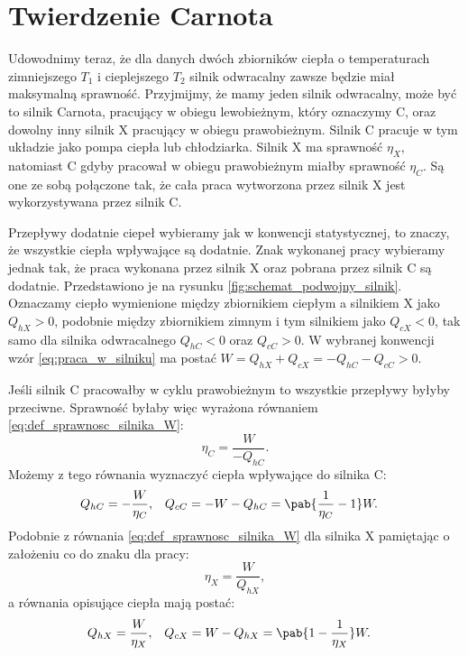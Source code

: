 
\section{Twierdzenie Carnota}
Udowodnimy teraz, że dla danych dwóch zbiorników ciepła o temperaturach zimniejszego \(T_1\) i cieplejszego \(T_2\) silnik odwracalny zawsze będzie miał maksymalną sprawność. Przyjmijmy, że mamy jeden silnik odwracalny, może być to silnik Carnota, pracujący w obiegu lewobieżnym, który oznaczymy C, oraz dowolny inny silnik X pracujący w obiegu prawobieżnym. Silnik C pracuje w tym układzie jako pompa ciepła lub chłodziarka. Silnik X ma sprawność \(\eta_X\), natomiast C gdyby pracował w obiegu prawobieżnym miałby sprawność \(\eta_C\). Są one ze sobą połączone tak, że cała praca wytworzona przez silnik X jest wykorzystywana przez silnik C.

Przepływy dodatnie ciepeł wybieramy jak w konwencji statystycznej, to znaczy, że wszystkie ciepła wpływające są dodatnie. Znak wykonanej pracy wybieramy jednak tak, że praca wykonana przez silnik X oraz pobrana przez silnik C są dodatnie. Przedstawiono je na rysunku \ref{fig:schemat_podwojny_silnik}. Oznaczamy ciepło wymienione między zbiornikiem ciepłym a silnikiem X jako \(Q_{hX} > 0\), podobnie między zbiornikiem zimnym i tym silnikiem jako \(Q_{cX} < 0\), tak samo dla silnika odwracalnego \(Q_{hC} < 0\) oraz \(Q_{cC} > 0\). W wybranej konwencji wzór \eqref{eq:praca_w_silniku} ma postać \(W = Q_{hX} + Q_{cX} = - Q_{hC} - Q_{cC} > 0\).

Jeśli silnik C pracowałby w cyklu prawobieżnym to wszystkie przepływy byłyby przeciwne. Sprawność byłaby więc wyrażona równaniem \eqref{eq:def_sprawnosc_silnika_W}:
\begin{equation}
	\eta_C = \frac{W}{-Q_{hC}}.
\end{equation}
Możemy z tego równania wyznaczyć ciepła wpływające do silnika C:
\begin{align}
	Q_{hC} &= - \frac{W}{\eta_C}, &
	Q_{cC} &= - W - Q_{hC} = \pab{\inv{\eta_C} - 1}W.
\end{align}
Podobnie z równania \eqref{eq:def_sprawnosc_silnika_W} dla silnika X pamiętając o założeniu co do znaku dla pracy:
\begin{equation}
	\eta_X = \frac{W}{Q_{hX}},
\end{equation}
a równania opisujące ciepła mają postać:
\begin{align}
	Q_{hX} &= \frac{W}{\eta_X}, &
	Q_{cX} &= W - Q_{hX} = \pab{1 - \inv{\eta_X}}W.
\end{align}

